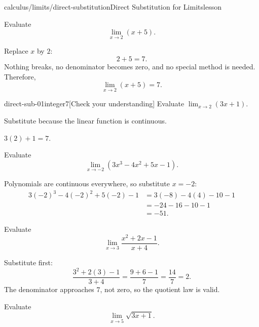 \documentclass[11pt,openany]{book}
\theoremstyle{bgplain}
\newcounter{bgexample}[chapter]
\newcounter{bgcheck}[section]
\begin{document}
\begin{webpage}{calculus/limits/direct-substitution}{Direct Substitution for Limits}{lesson}
\begin{bgguided}[title={Substitute and stop}]
Evaluate
\[
  \lim_{x\to2}(x+5).
\]

\begin{bgsolution}
Replace \(x\) by \(2\):
\[
  2+5=7.
\]
Nothing breaks, no denominator becomes zero, and no special method is needed. Therefore,
\[
  \boxed{\lim_{x\to2}(x+5)=7}.
\]
\end{bgsolution}
\end{bgguided}


\begin{bgcheck}{direct-sub-01}{integer}{7}[Check your understanding]
Evaluate \(\lim_{x\to2}(3x+1)\).
\begin{bghint}
Substitute because the linear function is continuous.
\end{bghint}
\begin{bgreveal}
\(3(2)+1=7\).
\end{bgreveal}
\end{bgcheck}



\begin{bgexample}[title={Polynomial substitution}]
Evaluate
\[
  \lim_{x\to-2}(3x^3-4x^2+5x-1).
\]

\begin{bgsolution}
Polynomials are continuous everywhere, so substitute \(x=-2\):
\begin{align*}
3(-2)^3-4(-2)^2+5(-2)-1
&=3(-8)-4(4)-10-1\\
&=-24-16-10-1\\
&=\boxed{-51}.
\end{align*}
\end{bgsolution}
\end{bgexample}

\begin{bgexample}[title={Rational function with a safe denominator}]
Evaluate
\[
  \lim_{x\to3}\frac{x^2+2x-1}{x+4}.
\]

\begin{bgsolution}
Substitute first:
\[
  \frac{3^2+2(3)-1}{3+4}
  =\frac{9+6-1}{7}
  =\frac{14}{7}
  =\boxed{2}.
\]
The denominator approaches \(7\), not zero, so the quotient law is valid.
\end{bgsolution}
\end{bgexample}

\begin{bgexample}[title={A root function}]
Evaluate
\[
  \lim_{x\to5}\sqrt{3x+1}.
\]


\end{bgexample}
\end{webpage}
\end{document}
